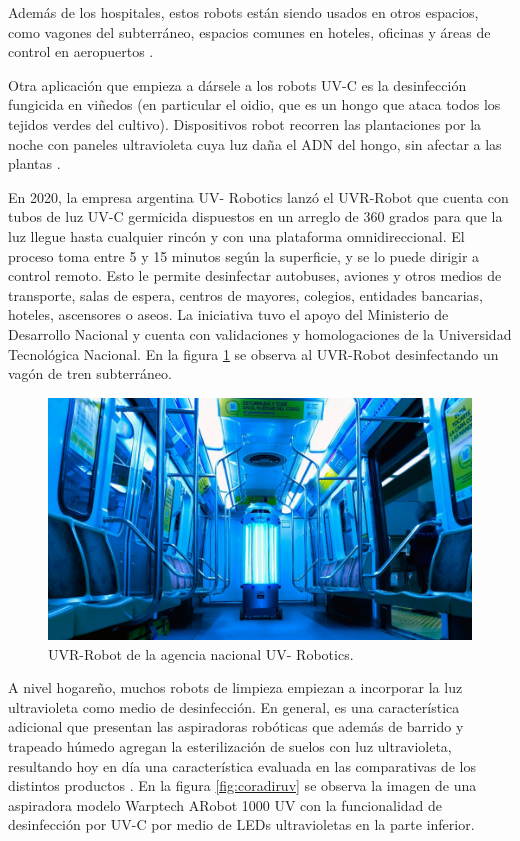 Además de los hospitales, estos robots están siendo usados en otros espacios, como vagones del subterráneo, espacios comunes en hoteles, oficinas y áreas de control en aeropuertos \citep{masrobots}.

Otra aplicación que empieza a dársele a los robots UV-C es la desinfección fungicida en viñedos (en particular el oidio, que es un hongo que ataca todos los tejidos verdes del cultivo). Dispositivos robot recorren las plantaciones por la noche con paneles ultravioleta cuya luz daña el ADN del hongo, sin afectar a las plantas \citep{infowine}.

En 2020, la empresa argentina UV- Robotics lanzó el UVR-Robot \citep{UVR} que cuenta con tubos de luz UV-C germicida dispuestos en un arreglo de 360 grados para que la luz llegue hasta cualquier rincón y con una plataforma omnidireccional. El proceso toma  entre 5 y 15 minutos según la superficie, y se lo puede dirigir a control remoto. Esto le permite desinfectar autobuses, aviones y otros medios de transporte, salas de espera, centros de mayores, colegios, entidades bancarias, hoteles, ascensores o aseos. La iniciativa  tuvo el apoyo del Ministerio de Desarrollo Nacional y cuenta con validaciones y homologaciones de la Universidad Tecnológica Nacional. En la figura \ref{fig:uvrobot} se observa al UVR-Robot desinfectando un vagón de tren subterráneo. 

\begin{figure}[h]
	\centering
	\includegraphics[width=12cm]{./Figures/uvrobot.jpeg}
	\caption{UVR-Robot de la agencia nacional UV- Robotics\protect\footnotemark.}
	\label{fig:uvrobot}
\end{figure}

A nivel hogareño, muchos robots de limpieza empiezan a incorporar la luz ultravioleta como medio de desinfección. En general, es una característica adicional que presentan las aspiradoras robóticas que además de barrido y trapeado húmedo agregan la esterilización de suelos con luz ultravioleta, resultando hoy en día una característica evaluada en las comparativas de los distintos productos  \citep{Bidcom}. En la figura \ref{fig:coradiruv} se observa la imagen de una aspiradora modelo Warptech ARobot 1000 UV con la funcionalidad de desinfección por UV-C por medio de LEDs ultravioletas en la parte inferior.


